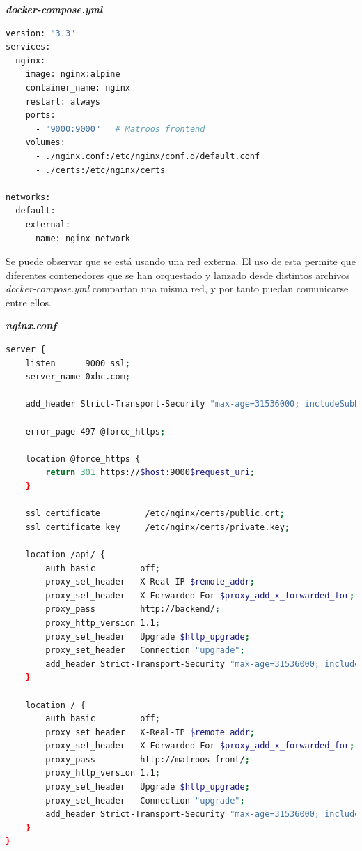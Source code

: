 \textbf{\textit{docker-compose.yml}}

\begin{lstlisting}[language=sh]
version: "3.3"
services:
  nginx:
    image: nginx:alpine
    container_name: nginx
    restart: always
    ports:
      - "9000:9000"   # Matroos frontend
    volumes:
      - ./nginx.conf:/etc/nginx/conf.d/default.conf
      - ./certs:/etc/nginx/certs

networks:
  default:
    external:
      name: nginx-network
\end{lstlisting}

Se puede observar que se está usando una red externa. El uso de esta permite que diferentes contenedores que se han orquestado y lanzado desde distintos archivos \textit{docker-compose.yml} compartan una misma red, y por tanto puedan comunicarse entre ellos.

\bigskip

\textbf{\textit{nginx.conf}}

\begin{lstlisting}[language=sh]
server {
    listen      9000 ssl;
    server_name 0xhc.com;

    add_header Strict-Transport-Security "max-age=31536000; includeSubDomains" always;

    error_page 497 @force_https;

    location @force_https {
        return 301 https://$host:9000$request_uri;
    }

    ssl_certificate         /etc/nginx/certs/public.crt;
    ssl_certificate_key     /etc/nginx/certs/private.key;

    location /api/ {
        auth_basic         off;
        proxy_set_header   X-Real-IP $remote_addr;
        proxy_set_header   X-Forwarded-For $proxy_add_x_forwarded_for;
        proxy_pass         http://backend/;
        proxy_http_version 1.1;
        proxy_set_header   Upgrade $http_upgrade;
        proxy_set_header   Connection "upgrade";
        add_header Strict-Transport-Security "max-age=31536000; includeSubDomains" always;
    }

    location / {
        auth_basic         off;
        proxy_set_header   X-Real-IP $remote_addr;
        proxy_set_header   X-Forwarded-For $proxy_add_x_forwarded_for;
        proxy_pass         http://matroos-front/;
        proxy_http_version 1.1;
        proxy_set_header   Upgrade $http_upgrade;
        proxy_set_header   Connection "upgrade";
        add_header Strict-Transport-Security "max-age=31536000; includeSubDomains" always;
    }
}
\end{lstlisting}

